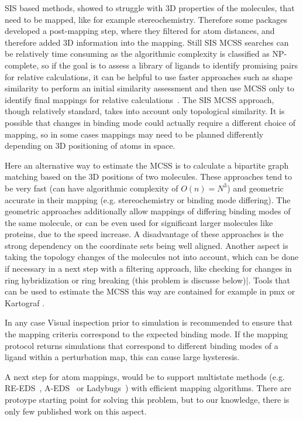 \documentclass[9pt,bestpractices,pubversion]{livecoms}
\begin{document}
SIS based methods, showed to struggle with 3D properties of the molecules, that need to be mapped, like for example stereochemistry. Therefore some packages developed a post-mapping step, where they filtered for atom distances, and therefore added 3D information into the mapping.
Still SIS MCSS searches can be relatively time consuming as the algorithmic complexity is classified as NP-complete, so if the goal is to assess a library of ligands to identify promising pairs for relative calculations, it can be helpful to use faster approaches such as shape similarity to perform an initial similarity assessment and then use MCSS only to identify final mappings for relative calculations~\cite{raymond2002maximum,klabunde2012mars,jones2009elucidating, Duesbury2018Comparison}. The SIS MCSS approach, though relatively standard, takes into account only topological similarity. It is possible that changes in binding mode could actually require a different choice of mapping, so in some cases mappings may need to be planned differently depending on 3D positioning of atoms in space. 

Here an alternative way to estimate the MCSS is to calculate a bipartite graph matching based on the 3D positions of two molecules. These approaches tend to be very fast (can have algorithmic complexity of $O(n)=N^3$) and geometric accurate in their mapping (e.g. stereochemistry or binding mode differing).
The geometric approaches additionally allow mappings of differing binding modes of the same molecule, or can be even used for significant larger molecules like proteins, due to the speed increase.
A disadvantage of these approaches is the strong dependency on the coordinate sets being well aligned. Another aspect is taking the topology changes of the molecules not into account, which can be done if necessary in a next step with a filtering approach, like checking for changes in ring hybridization or ring breaking (this problem is discusse below)|.
Tools that can be used to estimate the MCSS this way are contained for example in pmx \cite{gapsys2015pmx} or Kartograf \cite{ries2024kartograf}.

In any case Visual inspection prior to simulation is recommended to ensure that the mapping criteria correspond to the expected binding mode. If the mapping protocol returns simulations that correspond to different binding modes of a ligand within a perturbation map, this can cause large hysteresis.

A next step for atom mappings, would be to support multistate methods (e.g. RE-EDS~\cite{sidler2016replica}, A-EDS~\cite{perthold2020toward} or Ladybugs~\cite{robo2022achieving}) with efficient mapping algorithms. There are protoype starting point for solving this problem, but to our knowledge, there is only few published work on this aspect. \cite{petrov2021Perturbation}
\end{document}
